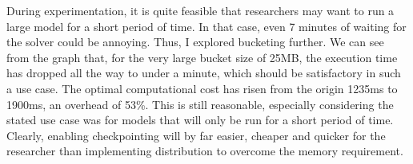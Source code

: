 During experimentation, it is quite feasible that researchers may want to run a large model for a short period of time.
In that case, even 7 minutes of waiting for the solver could be annoying.
Thus, I explored bucketing further.
We can see from the graph that, for the very large bucket size of 25MB, the execution time has dropped all the way to under a minute, which should be satisfactory in such a use case.
The optimal computational cost has risen from the origin 1235ms to 1900ms, an overhead of 53\%.
This is still reasonable, especially considering the stated use case was for models that will only be run for a short period of time.
Clearly, enabling checkpointing will by far easier, cheaper and quicker for the researcher than implementing distribution to overcome the memory requirement.
